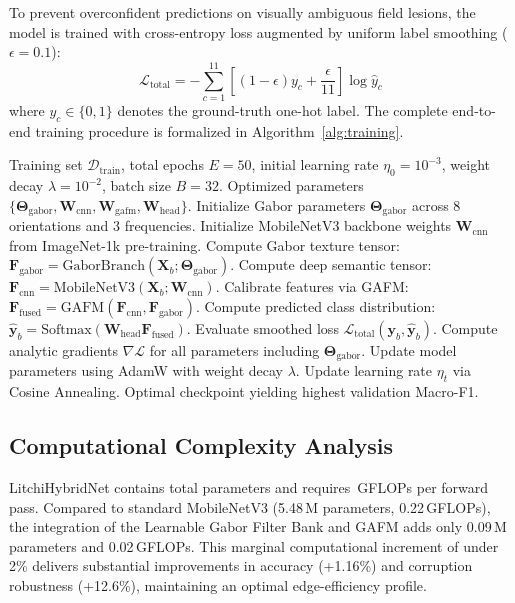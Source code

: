 To prevent overconfident predictions on visually ambiguous field lesions, the model is trained with cross-entropy loss augmented by uniform label smoothing ($\epsilon = 0.1$):
\begin{equation}
    \mathcal{L}_{\text{total}} = -\sum_{c=1}^{11} \left[ (1 - \epsilon) y_c + \frac{\epsilon}{11} \right] \log \hat{y}_c
\end{equation}
where $y_c \in \{0, 1\}$ denotes the ground-truth one-hot label. The complete end-to-end training procedure is formalized in Algorithm~\ref{alg:training}.

\begin{algorithm}[t]
\caption{LitchiHybridNet Dual-Branch Training Pipeline}
\label{alg:training}
\begin{algorithmic}[1]
\REQUIRE Training set $\mathcal{D}_{\text{train}}$, total epochs $E = 50$, initial learning rate $\eta_0 = 10^{-3}$, weight decay $\lambda = 10^{-2}$, batch size $B = 32$.
\ENSURE Optimized parameters $\{\mathbf{\Theta}_{\text{gabor}}, \mathbf{W}_{\text{cnn}}, \mathbf{W}_{\text{gafm}}, \mathbf{W}_{\text{head}}\}$.
\STATE Initialize Gabor parameters $\mathbf{\Theta}_{\text{gabor}}$ across 8 orientations and 3 frequencies.
\STATE Initialize MobileNetV3 backbone weights $\mathbf{W}_{\text{cnn}}$ from ImageNet-1k pre-training.
        \STATE Compute Gabor texture tensor: $\mathbf{F}_{\text{gabor}} = \text{GaborBranch}(\mathbf{X}_b; \mathbf{\Theta}_{\text{gabor}})$.
        \STATE Compute deep semantic tensor: $\mathbf{F}_{\text{cnn}} = \text{MobileNetV3}(\mathbf{X}_b; \mathbf{W}_{\text{cnn}})$.
        \STATE Calibrate features via GAFM: $\mathbf{F}_{\text{fused}} = \text{GAFM}(\mathbf{F}_{\text{cnn}}, \mathbf{F}_{\text{gabor}})$.
        \STATE Compute predicted class distribution: $\hat{\mathbf{y}}_b = \text{Softmax}(\mathbf{W}_{\text{head}} \mathbf{F}_{\text{fused}})$.
        \STATE Evaluate smoothed loss $\mathcal{L}_{\text{total}}(\mathbf{y}_b, \hat{\mathbf{y}}_b)$.
        \STATE Compute analytic gradients $\nabla \mathcal{L}$ for all parameters including $\mathbf{\Theta}_{\text{gabor}}$.
        \STATE Update model parameters using AdamW with weight decay $\lambda$.
        \STATE Update learning rate $\eta_t$ via Cosine Annealing.
    \ENDFOR
\ENDFOR
\RETURN Optimal checkpoint yielding highest validation Macro-F1.
\end{algorithmic}
\end{algorithm}

\subsection{Computational Complexity Analysis}
LitchiHybridNet contains \paramCountMillion{} total parameters and requires \gigaFlops{}\,GFLOPs per forward pass. Compared to standard MobileNetV3 (5.48\,M parameters, 0.22\,GFLOPs), the integration of the Learnable Gabor Filter Bank and GAFM adds only 0.09\,M parameters and 0.02\,GFLOPs. This marginal computational increment of under 2\% delivers substantial improvements in accuracy (+1.16\%) and corruption robustness (+12.6\%), maintaining an optimal edge-efficiency profile.
